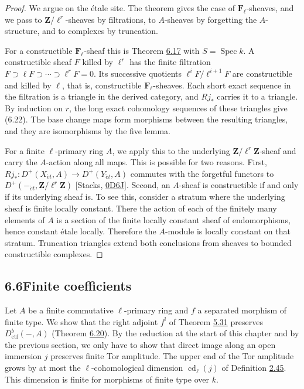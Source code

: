 \documentclass[11pt]{article}
\providecommand{\Fell}{}\renewcommand{\Fell}{\mathbf F_\ell}
\begin{document}
\begin{proof}[{Proof}]\label{bp567}%
We argue on the étale site. The theorem gives the case of \(\Fell\)-sheaves, and we pass to \(\mathbf Z/\ell^r\)-sheaves by filtrations, to \(A\)-sheaves by forgetting the \(A\)-structure, and to complexes by truncation.

For a constructible \(\Fell\)-sheaf this is Theorem \hyperref[bp563]{6.17} with \(S=\operatorname{Spec}k\). A constructible sheaf \(F\) killed by \(\ell^r\) has the finite filtration \(F\supset\ell F\supset\cdots\supset\ell^rF=0\). Its successive quotients \(\ell^iF/\ell^{i+1}F\) are constructible and killed by \(\ell\), that is, constructible \(\Fell\)-sheaves. Each short exact sequence in the filtration is a triangle in the derived category, and \(Rj_*\) carries it to a triangle. By induction on \(r\), the long exact cohomology sequences of these triangles give (6.22). The base change maps form morphisms between the resulting triangles, and they are isomorphisms by the five lemma.

For a finite \(\ell\)-primary ring \(A\), we apply this to the underlying \(\mathbf Z/\ell^r\mathbf Z\)-sheaf and carry the \(A\)-action along all maps. This is possible for two reasons. First, \(Rj_*:D^+(X_{\acute{e}t},A)\to D^+(Y_{\acute{e}t},A)\) commutes with the forgetful functors to \(D^+(-_{\acute{e}t},\mathbf Z/\ell^r\mathbf Z)\) [Stacks, \href{https://stacks.math.columbia.edu/tag/0D6J}{0D6J}]. Second, an \(A\)-sheaf is constructible if and only if its underlying sheaf is. To see this, consider a stratum where the underlying sheaf is finite locally constant. There the action of each of the finitely many elements of \(A\) is a section of the finite locally constant sheaf of endomorphisms, hence constant étale locally. Therefore the \(A\)-module is locally constant on that stratum. Truncation triangles extend both conclusions from sheaves to bounded constructible complexes.
\end{proof}


\subsection*{\texorpdfstring{6.6\quad Finite coefficients}{6.6 Finite coefficients}}
\label{bp568}%
\label{bp569}%
Let \(A\) be a finite commutative \(\ell\)-primary ring and \(f\) a separated morphism of finite type. We show that the right adjoint \(f^!\) of Theorem \hyperref[bp506]{5.31} preserves \(D^b_{\mathrm{ctf}}(-,A)\) (Theorem \hyperref[bp573]{6.20}). By the reduction at the start of this chapter and by the previous section, we only have to show that direct image along an open immersion \(j\) preserves finite Tor amplitude. The upper end of the Tor amplitude grows by at most the \(\ell\)-cohomological dimension \(\operatorname{cd}_\ell(j)\) of Definition \hyperref[bp137]{2.45}. This dimension is finite for morphisms of finite type over \(k\).
\end{document}
